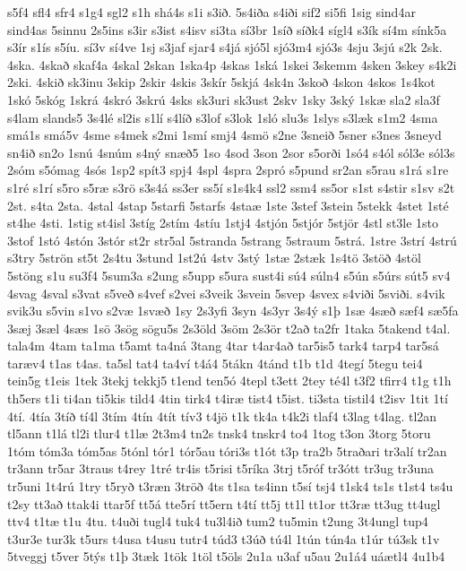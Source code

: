 {s5f4
sfl4
sfr4
s1g4
sgl2
s1h
shá4s
s1i
s3ið.
5s4iða
s4iði
sif2
si5fi
1sig
sind4ar
sind4as
5sinnu
2s5ins
s3ir
s3ist
s4isv
si3ta
sí3br
1síð
síðk4
sígl4
s3ík
sí4m
sínk5a
s3ír
s1ís
s5íu.
sí3v
sí4ve
1sj
s3jaf
sjar4
s4já
sjó5l
sjó3m4
sjó3s
4sju
3sjú
s2k
2sk.
4ska.
4skað
skaf4a
4skal
2skan
1ska4p
4skas
1ská
1skei
3skemm
4sken
3skey
s4k2i
2ski.
4skið
sk3inu
3skip
2skir
4skis
3skír
5skjá
4sk4n
3skoð
4skon
4skos
1s4kot
1skó
5skóg
1skrá
4skró
3skrú
4sks
sk3uri
sk3ust
2skv
1sky
3ský
1skæ
sla2
sla3f
s4lam
slands5
3s4lé
sl2is
s1lí
s4líð
s3lof
s3lok
1sló
slu3s
1slys
s3læk
s1m2
4sma
smá1s
smá5v
4sme
s4mek
s2mi
1smí
smj4
4smö
s2ne
3sneið
5sner
s3nes
3sneyd
sn4ið
sn2o
1snú
4snúm
s4ný
snæð5
1so
4sod
3son
2sor
s5orði
1só4
s4ól
sól3e
sól3s
2sóm
s5ómag
4sós
1sp2
spít3
spj4
4spl
4spra
2spró
s5pund
sr2an
s5rau
s1rá
s1re
s1ré
s1rí
s5ro
s5ræ
s3rö
s3s4á
ss3er
ss5í
s1s4k4
ssl2
ssm4
ss5or
s1st
s4stir
s1sv
s2t
2st.
s4ta
2sta.
4stal
4stap
5starfi
5starfs
4staæ
1ste
3stef
3stein
5stekk
4stet
1sté
st4he
4sti.
1stig
st4isl
3stíg
2stím
4stíu
1stj4
4stjón
5stjór
5stjör
4stl
st3le
1sto
3stof
1stó
4stón
3stór
st2r
str5al
5stranda
5strang
5straum
5strá.
1stre
3strí
4strú
s3try
5strön
st5t
2s4tu
3stund
1st2ú
4stv
3stý
1stæ
2stæk
1s4tö
3stöð
4stöl
5stöng
s1u
su3f4
5sum3a
s2ung
s5upp
s5ura
sust4i
sú4
súln4
s5ún
s5úrs
sút5
sv4
4svag
4sval
s3vat
s5veð
s4vef
s2vei
s3veik
3svein
5svep
4svex
s4viði
5sviði.
s4vik
svik3u
s5vin
s1vo
s2væ
1svæð
1sy
2s3yfi
3syn
4s3yr
3s4ý
s1þ
1sæ
4sæð
sæf4
sæ5fa
3sæj
3sæl
4sæs
1sö
3sög
sögu5s
2s3öld
3söm
2s3ör
t2að
ta2fr
1taka
5takend
t4al.
tala4m
4tam
ta1ma
t5amt
ta4ná
3tang
4tar
t4ar4að
tar5is5
tark4
tarp4
tar5sá
taræv4
t1as
t4as.
ta5sl
tat4
ta4ví
t4á4
5tákn
4tánd
t1b
t1d
4tegí
5tegu
tei4
tein5g
t1eis
1tek
3tekj
tekkj5
t1end
ten5ó
4tepl
t3ett
2tey
té4l
t3f2
tfirr4
t1g
t1h
th5ers
t1i
ti4an
ti5kis
tild4
4tin
tirk4
t4iræ
tist4
t5ist.
ti3sta
tistil4
t2isv
1tit
1tí
4tí.
4tía
3tíð
tí4l
3tím
4tín
4tít
tív3
t4jö
t1k
tk4a
t4k2i
tlaf4
t3lag
t4lag.
tl2an
tl5ann
t1lá
tl2i
tlur4
t1læ
2t3m4
tn2s
tnsk4
tnskr4
to4
1tog
t3on
3torg
5toru
1tóm
tóm3a
tóm5as
5tónl
tór1
tór5au
tóri3s
t1ót
t3p
tra2b
5traðari
tr3alí
tr2an
tr3ann
tr5ar
3traus
t4rey
1tré
tr4is
t5risi
t5ríka
3trj
t5róf
tr3ótt
tr3ug
tr3una
tr5uni
1t4rú
1try
t5ryð
t3ræn
3tröð
4ts
t1sa
ts4inn
t5sí
tsj4
t1sk4
ts1s
t1st4
ts4u
t2sy
tt3að
ttak4i
ttar5f
tt5á
tte5rí
tt5ern
t4tí
tt5j
tt1l
tt1or
tt3ræ
tt3ug
tt4ugl
ttv4
t1tæ
t1u
4tu.
t4uði
tugl4
tuk4
tu3l4ið
tum2
tu5min
t2ung
3t4ungl
tup4
t3ur3e
tur3k
t5urs
t4usa
t4usu
tutr4
túd3
t3úð
tú4l
1tún
tún4a
t1úr
tú3sk
t1v
5tveggj
t5ver
5týs
t1þ
3tæk
1tök
1töl
t5öls
2u1a
u3af
u5au
2u1á4
uáætl4
4u1b4
}
